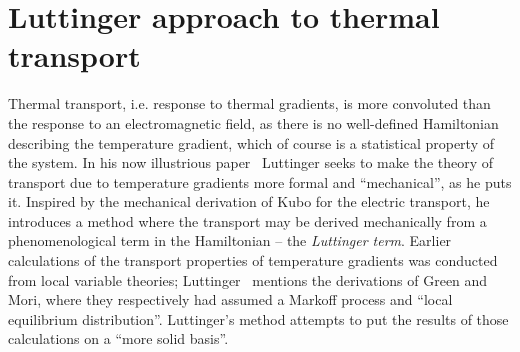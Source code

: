 
\section{Luttinger approach to thermal transport}
Thermal transport, i.e. response to thermal gradients, is more convoluted than the response to an electromagnetic field, as there is no well-defined Hamiltonian describing the temperature gradient, which of course is a statistical property of the system.
In his now illustrious paper~\cite{luttingerTheoryThermalTransport1964} Luttinger seeks to make the theory of transport due to temperature gradients more formal and ``mechanical'', as he puts it.
Inspired by the mechanical derivation of Kubo for the electric transport, he introduces a method where the transport may be derived mechanically from a phenomenological term in the Hamiltonian -- the \emph{Luttinger term}.
Earlier calculations of the transport properties of temperature gradients was conducted from local variable theories;
Luttinger~\cite{luttingerTheoryThermalTransport1964} mentions the derivations of Green and Mori, where they respectively had assumed a Markoff process and ``local equilibrium distribution''.
Luttinger's method attempts to put the results of those calculations on a ``more solid basis''.

